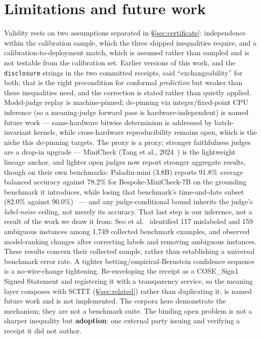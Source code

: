 \documentclass[11pt]{article}
\theoremstyle{definition}
\begin{document}
\section{Limitations and future work}\label{sec:limits}

Validity rests on two assumptions separated in \S\ref{sec:certificate}:
independence within the calibration sample, which the three shipped
inequalities require, and a calibration-to-deployment match, which is assumed
rather than sampled and is not testable from the calibration set. Earlier
versions of this work, and the \texttt{disclosure} strings in the two
committed receipts, said ``exchangeability'' for both; that is the right
precondition for conformal \emph{prediction} but weaker than these
inequalities need, and the correction is stated rather than quietly applied. Model-judge replay is machine-pinned; de-pinning via
integer/fixed-point CPU inference (so a meaning-judge forward pass is
hardware-independent) is named future work --- same-hardware bitwise
determinism is addressed by batch-invariant kernels, while cross-hardware
reproducibility remains open, which is the niche this
de-pinning targets. The proxy is a proxy; stronger faithfulness judges are a
drop-in upgrade --- MiniCheck (Tang et al., 2024~\cite{minicheck2024}) is
the lightweight lineage anchor, and lighter open judges now report stronger
aggregate results, though on their own benchmarks: Paladin-mini (3.8B) reports
91.8\% average balanced accuracy against 78.2\% for Bespoke-MiniCheck-7B on
the grounding benchmark it introduces, while losing that benchmark's
time-and-date subset (82.0\% against 90.0\%)~\cite{paladinmini2025} --- and
any
judge-conditional bound inherits the judge's \emph{label-noise} ceiling, not
merely its accuracy. That last step is our inference, not a result of the work
we draw it from: Seo et al.~\cite{verifyingverifiers2025} identified 117
mislabeled and 159 ambiguous instances among 1,749 collected benchmark
examples, and observed model-ranking changes after correcting labels and
removing ambiguous instances. These results concern their collected sample,
rather than establishing a universal benchmark error rate. A tighter
betting/empirical-Bernstein confidence sequence is a no-wire-change
tightening. Re-enveloping the receipt as a COSE\_Sign1 Signed Statement and
registering it with a transparency service, so the meaning layer composes with
SCITT (\S\ref{sec:related}) rather than duplicating it, is named future work
and is not implemented. The corpora here demonstrate the mechanism; they are not a
benchmark suite. The binding open problem is not a sharper inequality but
\textbf{adoption}: one external party issuing and verifying a receipt it did
not author.
\end{document}
